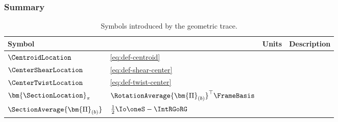 \subsubsection{Summary}

\begin{table}[H]
    \centering
    \caption{Symbols introduced by the geometric trace.}
    \begin{tabular}{llcl}
    \toprule
    Symbol & & Units & Description \\ \midrule
    \(\CentroidLocation\)     & \eqref{eq:def-centroid} \\
    \(\CenterShearLocation\)  & \eqref{eq:def-shear-center} \\
    \(\CenterTwistLocation\)  & \eqref{eq:def-twist-center} \\
    \(\bm{\SectionLocation}_{\pi}\) & \(\RotationAverage{\bm{\Pi}_{(b)}}^{\top}\FrameBasis\) \\
    \(\SectionAverage{\bm{\Pi}_{(b)}}\) & \(\tfrac12\Io\oneS - \IntRGoRG\) \\
    \bottomrule
    \end{tabular}
\end{table}

